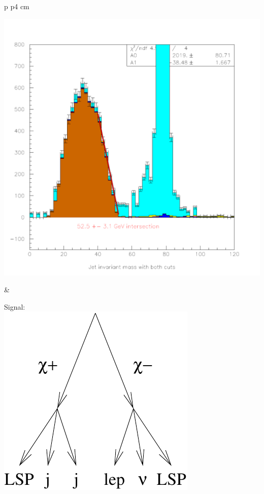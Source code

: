 \documentclass[landscape]{article}
\begin{document}
\begin{center} \begin{tabular}{p{\textheight} p{4 cm}}
    \begin{minipage}{\linewidth}
      \includegraphics[width=\linewidth]{charginos_2.pdf}
    \end{minipage} &
    \begin{minipage}{\linewidth}
      Signal: \\
      \includegraphics[width=\linewidth]{charginos_signal.pdf}


\end{minipage}
\end{tabular}
\end{center}
\end{document}
